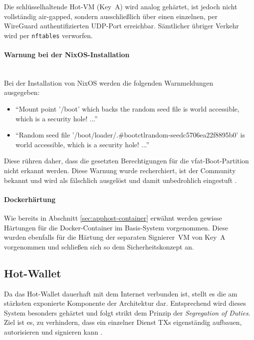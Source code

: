 Die schlüsselhaltende Hot-\ac{VM} (Key~A) wird analog gehärtet, ist jedoch nicht vollständig air-gapped, sondern ausschließlich über einen einzelnen, per WireGuard authentifizierten \ac{UDP}-Port erreichbar. Sämtlicher übriger Verkehr wird per \texttt{nftables} verworfen.

\paragraph{Warnung bei der NixOS-Installation} \mbox{}\\
Bei der Installation von NixOS werden die folgenden Warnmeldungen ausgegeben:
\begin{itemize}
    \item \enquote{Mount point '/boot' which backs the random seed file is world accessible, which is a security hole! ...}
    \item \enquote{Random seed file '/boot/loader/.\#bootctlrandom-seedc5706ea22f8895b0' is world accessible, which is a security hole! ...}
\end{itemize}

Diese rühren daher, dass die gesetzten Berechtigungen für die vfat-Boot-Partition nicht erkannt werden.
Diese Warnung wurde recherchiert, ist der Community bekannt und wird als fälschlich ausgelöst und damit unbedrohlich eingestuft \cite{nixOS_warnung}.

\paragraph{Dockerhärtung}

Wie bereits in Abschnitt \ref{sec:apphost-container} erwähnt werden gewisse Härtungen für die Docker-Container im Basis-System vorgenommen.
Diese wurden ebenfalls für die Härtung der separaten Signierer~\ac{VM} von Key~A vorgenommen und schließen sich so dem Sicherheitskonzept an.

\subsection{Hot-Wallet}

Da das Hot-Wallet dauerhaft mit dem Internet verbunden ist, stellt es die am stärksten exponierte Komponente der Architektur dar. Entsprechend wird dieses System besonders gehärtet und folgt strikt dem Prinzip der \emph{Segregation of Duties}. Ziel ist es, zu verhindern, dass ein einzelner Dienst \acp{TX} eigenständig aufbauen, autorisieren und signieren kann \cite{nadcab_custodial_arch, nist_sp800_53}.

